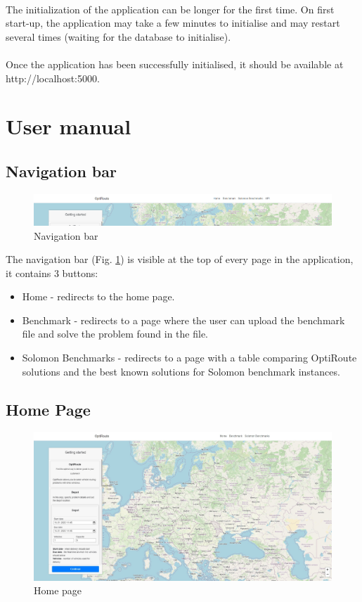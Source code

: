 \documentclass[a4paper,twoside,12pt]{book}
\begin{document}
\paragraph{}

The initialization of the application can be longer for the first time.
On first start-up, the application may take a few minutes to initialise and may restart several times (waiting for the database to initialise).
\paragraph{}
Once the application has been successfully initialised, it should be available at http://localhost:5000.
\section{User manual}
\subsection{Navigation bar}
\begin{figure}[H]
\centering
\includegraphics[scale=0.3]{images/navbar.PNG}
\caption{Navigation bar}
\label{fig:navbar}
\end{figure}

The navigation bar (Fig. \ref{fig:navbar}) is visible at the top of every page in the application, it contains 3 buttons:
\begin{itemize}
\item Home - redirects to the home page.
\item Benchmark - redirects to a page where the user can upload the benchmark file and solve the problem found in the file.
\item Solomon Benchmarks - redirects to a page with a table comparing OptiRoute solutions and the best known solutions for Solomon benchmark instances.
\end{itemize}

\subsection{Home Page}
\begin{figure}[H]
\centering
\includegraphics[scale=0.3]{images/home.jpg}
\caption{Home page}
\label{fig:home}
\end{figure}
\end{document}
